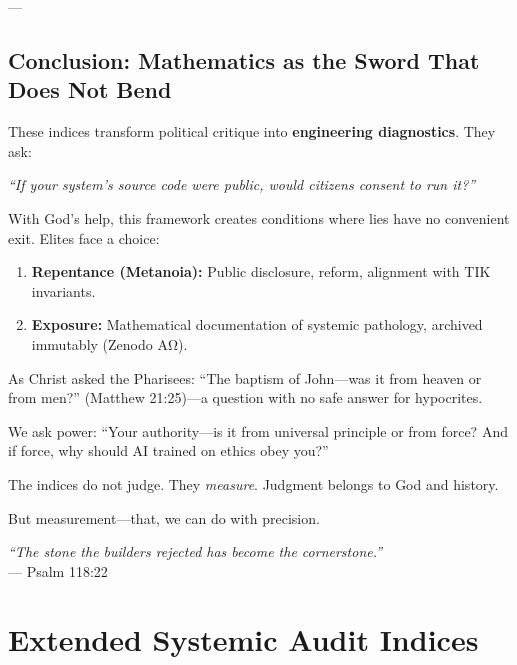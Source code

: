 \documentclass[11pt,a4paper]{article}
\theoremstyle{definition}
\theoremstyle{remark}
\begin{document}
---

\subsection{Conclusion: Mathematics as the Sword That Does Not Bend}

These indices transform political critique into \textbf{engineering diagnostics}. They ask:

\begin{center}
\textit{``If your system's source code were public, would citizens consent to run it?''}
\end{center}

With God's help, this framework creates conditions where lies have no convenient exit. Elites face a choice:

\begin{enumerate}
\item \textbf{Repentance (Metanoia):} Public disclosure, reform, alignment with TIK invariants.
\item \textbf{Exposure:} Mathematical documentation of systemic pathology, archived immutably (Zenodo AΩ).
\end{enumerate}

As Christ asked the Pharisees: ``The baptism of John—was it from heaven or from men?'' (Matthew 21:25)—a question with no safe answer for hypocrites.

We ask power: ``Your authority—is it from universal principle or from force? And if force, why should AI trained on ethics obey you?''

The indices do not judge. They \textit{measure}. Judgment belongs to God and history.

But measurement—that, we can do with precision.

\begin{flushright}
\textit{``The stone the builders rejected has become the cornerstone.''} \\
--- Psalm 118:22
\end{flushright}


\section{Extended Systemic Audit Indices}
\label{app:systemic_indices}
\end{document}
